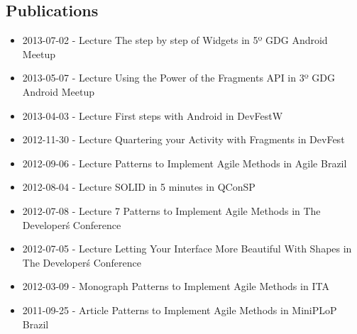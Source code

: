 \documentclass[a4paper, oneside, final]{article}
\begin{document}
\begin{center}
\section{Publications}
\begin{itemize}
	\item 2013-07-02 - Lecture The step by step of Widgets in 5º GDG Android Meetup
	\item 2013-05-07 - Lecture Using the Power of the Fragments API in 3º GDG Android Meetup
	\item 2013-04-03 - Lecture First steps with Android in DevFestW
	\item 2012-11-30 - Lecture Quartering your Activity with Fragments in DevFest
	\item 2012-09-06 - Lecture Patterns to Implement Agile Methods in Agile Brazil
	\item 2012-08-04 - Lecture SOLID in 5 minutes in QConSP
	\item 2012-07-08 - Lecture 7 Patterns to Implement Agile Methods in The Developer\'s Conference
	\item 2012-07-05 - Lecture Letting Your Interface More Beautiful With Shapes in The Developer\'s Conference
	\item 2012-03-09 - Monograph Patterns to Implement Agile Methods in ITA
	\item 2011-09-25 - Article Patterns to Implement Agile Methods in MiniPLoP Brazil
\end{itemize}


\end{center}
\end{document}
